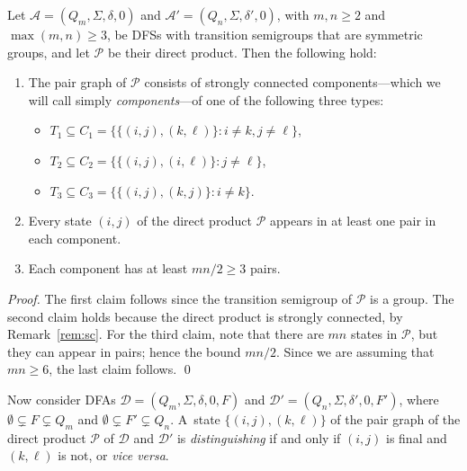 \documentclass{llncs}
\newcommand{\emp}{\emptyset}
\newcommand{\Sig}{\Sigma}
\newcommand{\bi}{\begin{itemize}}
\newcommand{\ei}{\end{itemize}}
\newcommand{\be}{\begin{enumerate}}
\newcommand{\ee}{\end{enumerate}}
\newcommand{\cA}{{\mathcal A}}
\newcommand{\cD}{{\mathcal D}}
\newcommand{\cP}{{\mathcal P}}
\begin{document}
\begin{proposition}
\label{prop:pairgraph}
Let $\cA=(Q_m,\Sig,\delta,0)$ and $\cA'=(Q_n,\Sig,\delta',0)$, with $m,n \ge 2$ and $\max(m,n)\ge 3$, be 
DFSs with transition semigroups  that are symmetric groups, and let $\cP$ be their direct product.
Then the following hold:
\be
\item
The pair graph of $\cP$ consists of strongly connected components---which we will call simply \emph{components}---of one of the following three types:
\bi
\item
$T_1\subseteq C_1=\{\{(i,j), (k,\ell)\}\colon i\neq k, j\neq \ell\}$, 
\item
$T_2\subseteq C_2=\{\{(i,j), (i,\ell)\}\colon j\neq \ell\}$, 
\item
$T_3\subseteq C_3=\{\{(i,j), (k,j)\}\colon i\neq k\}$. 
\ei
\item
Every state $(i,j)$ of the direct product $\cP$ appears in at least one pair in each component.\item
Each component has at least $mn/2\ge 3$ pairs.
\ee
\end{proposition}
\begin{proof}
The first claim follows since the transition semigroup of $\cP$ is a group.
The second claim holds because the direct product is strongly connected, by Remark~\ref{rem:sc}.
For the third claim, note that there are $mn$ states in $\cP$, but they can appear in pairs; hence the bound $mn/2$. Since we are assuming that $mn\ge 6$, the last claim follows.
\qed
\end{proof}

Now consider DFAs $\cD=(Q_m,\Sig,\delta,0,F)$ and $\cD'=(Q_n,\Sig,\delta',0,F')$, where
$\emp\subsetneq F \subsetneq Q_m$ and $\emp\subsetneq F' \subsetneq Q_n$.
A~state $\{(i,j), (k,\ell)\}$ of the pair graph of the direct product $\cP$ of $\cD$ and $\cD'$ is \emph{distinguishing} if and only if $(i,j)$ is final and $(k,\ell)$ is not, or \emph{vice versa}.
\end{document}

